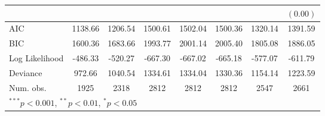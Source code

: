 \begin{tabular}{l c c c c c c c }
                                 &               &               &               &               &               &               & $(0.00)$      \\
\hline
AIC                              & 1138.66       & 1206.54       & 1500.61       & 1502.04       & 1500.36       & 1320.14       & 1391.59       \\
BIC                              & 1600.36       & 1683.66       & 1993.77       & 2001.14       & 2005.40       & 1805.08       & 1886.05       \\
Log Likelihood                   & -486.33       & -520.27       & -667.30       & -667.02       & -665.18       & -577.07       & -611.79       \\
Deviance                         & 972.66        & 1040.54       & 1334.61       & 1334.04       & 1330.36       & 1154.14       & 1223.59       \\
Num. obs.                        & 1925          & 2318          & 2812          & 2812          & 2812          & 2547          & 2661          \\
\hline
\multicolumn{8}{l}{\tiny{$^{***}p<0.001$, $^{**}p<0.01$, $^*p<0.05$}}
\end{tabular}
